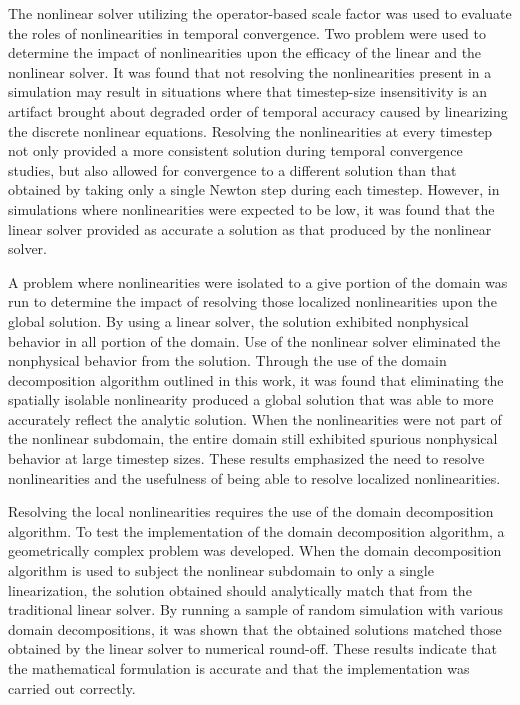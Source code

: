 The nonlinear solver utilizing the operator-based scale factor was used to evaluate the roles of nonlinearities in temporal convergence.
Two problem were used to determine the impact of nonlinearities upon the efficacy of the linear and the nonlinear solver.
It was found that not resolving the nonlinearities present in a simulation may result in situations where that timestep-size insensitivity is an artifact brought about degraded order of temporal accuracy caused by linearizing the discrete nonlinear equations.
Resolving the nonlinearities at every timestep not only provided a more consistent solution during temporal convergence studies, but also allowed for convergence to a different solution than that obtained by taking only a single Newton step during each timestep.
However, in simulations where nonlinearities were expected to be low, it was found that the linear solver provided as accurate a solution as that produced by the nonlinear solver.

A problem where nonlinearities were isolated to a give portion of the domain was run to determine the impact of resolving those localized nonlinearities upon the global solution.
By using a linear solver, the solution exhibited nonphysical behavior in all portion of the domain.
Use of the nonlinear solver eliminated the nonphysical behavior from the solution.
Through the use of the domain decomposition algorithm outlined in this work, it was found that eliminating the spatially isolable nonlinearity produced a global solution that was able to more accurately reflect the analytic solution.
When the nonlinearities were not part of the nonlinear subdomain, the entire domain still exhibited spurious nonphysical behavior at large timestep sizes.
These results emphasized the need to resolve nonlinearities and the usefulness of being able to resolve localized nonlinearities.

Resolving the local nonlinearities requires the use of the domain decomposition algorithm. 
To test the implementation of the domain decomposition algorithm, a geometrically complex problem was developed.
When the domain decomposition algorithm is used to subject the nonlinear subdomain to only a single linearization, the solution obtained should analytically match that from the traditional linear solver.
By running a sample of random simulation with various domain decompositions, it was shown that the obtained solutions matched those obtained by the linear solver to numerical round-off.
These results indicate that the mathematical formulation is accurate and that the implementation was carried out correctly.

